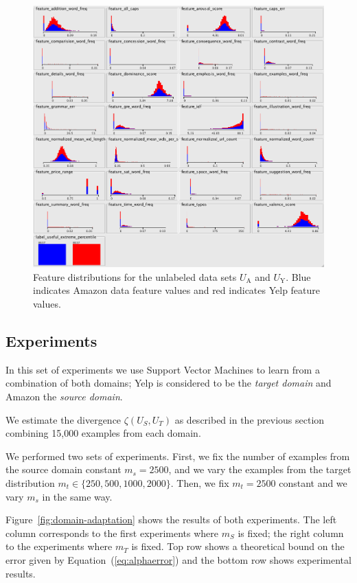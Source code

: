 \documentclass[letterpaper]{article}
\begin{document}
\begin{figure}[h]
	\centering
	\includegraphics[width=0.75\linewidth]{adaptation_unlabeled_features}
	\caption{Feature distributions for the unlabeled data sets $U_{\textrm{A}}$ and $U_{\textrm{Y}}$.  
	Blue indicates Amazon data feature values and red indicates Yelp feature values.}
\end{figure}

\subsection{Experiments}
\label{sec:domain-adaptation}

In this set of experiments we use Support Vector Machines to learn
from a combination of both domains; Yelp is considered to be the
\emph{target domain} and Amazon the \emph{source domain}.

We estimate the divergence $\zeta(U_S,U_T)$ as described in the
previous section combining 15,000 examples from each domain.

We performed two sets of experiments. First, we fix the number of
examples from the source domain constant $m_s=2500$, and we vary the
examples from the target distribution $m_t \in \{250, 500, 1000,
2000\}$. Then, we fix $m_t=2500$ constant and we vary $m_s$ in the
same way. 

Figure~\ref{fig:domain-adaptation} shows the results of both
experiments. The left column corresponds to the first experiments where
$m_S$ is fixed; the right column to the experiments where $m_T$ is
fixed. Top row shows a theoretical bound on the error given by
Equation~(\ref{eq:alphaerror}) and the bottom row shows experimental
results.
\end{document}
